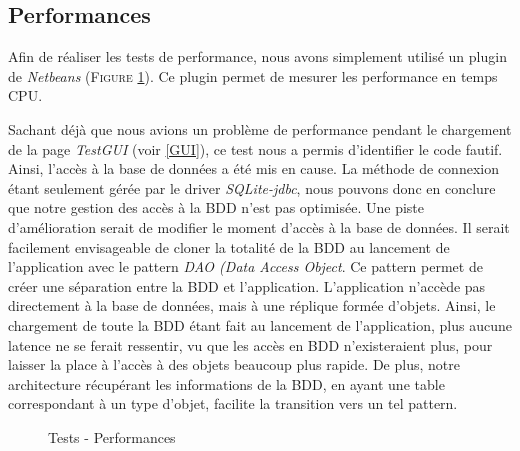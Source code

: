 \subsection{Performances}

Afin de réaliser les tests de performance, nous avons simplement utilisé un plugin de \textit{Netbeans} (\textsc{Figure} \ref{perf}). Ce plugin permet de mesurer les performance en temps CPU.

Sachant déjà que nous avions un problème de performance pendant le chargement de la page \textit{TestGUI} (voir \ref{GUI}), ce test nous a permis d'identifier le code fautif.
Ainsi, l'accès à la base de données a été mis en cause. La méthode de connexion étant seulement gérée par le driver \textit{SQLite-jdbc}, nous pouvons donc en conclure que notre gestion des accès à la BDD n'est pas optimisée.
Une piste d'amélioration serait de modifier le moment d'accès à la base de données. Il serait facilement envisageable de cloner la totalité de la BDD au lancement de l'application avec le pattern \textit{DAO (Data Access Object}. Ce pattern permet de créer une séparation entre la BDD et l'application. L'application n'accède pas directement à la base de données, mais à une réplique formée d'objets.
Ainsi, le chargement de toute la BDD étant fait au lancement de l'application, plus aucune latence ne se ferait ressentir, vu que les accès en BDD n'existeraient plus, pour laisser la place à l'accès à des objets beaucoup plus rapide.
De plus, notre architecture récupérant les informations de la BDD, en ayant une table correspondant à un type d'objet, facilite la transition vers un tel pattern.

\begin{figure}[!ht]
\begin{center}
  \caption{Tests - Performances}
  \label{perf} 
\end{center}
\end{figure}






